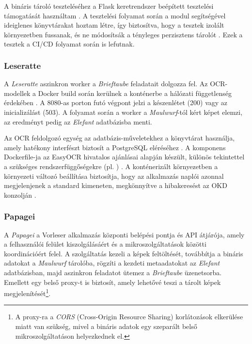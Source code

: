\documentclass[12pt]{article}
\begin{document}
	A bináris tároló teszteléséhez a Flask keretrendszer beépített tesztelési támogatását használtam \cite{flask-testing}. A tesztelési folyamat során a  modul segítségével ideiglenes könyvtárakat hoztam létre, így biztosítva, hogy a tesztek izolált környezetben fussanak, és ne módosítsák a tényleges perzisztens tárolót \cite{temp-testing}. Ezek a tesztek a CI/CD folyamat során is lefutnak.
	
	\subsubsection{Leseratte}
	A \textit{Leseratte} aszinkron worker a \textit{Brieftaube} feladatait dolgozza fel. Az OCR-modellek a Docker build során kerülnek a konténerbe a hálózati függetlenség érdekében \cite{easy-ocr-usage}. A 8080-as porton futó  végpont jelzi a készenlétet (200) vagy az inicializálást (503). A folyamat során a worker a \textit{Maulwurf}-tól kért képet elemzi, az eredményt pedig az \textit{Elefant} adatbázisba menti.
	
	Az OCR feldolgozó egység az adatbázis-műveletekhez a  könyvtárat használja, amely hatékony interfészt biztosít a PostgreSQL eléréséhez \cite{psycopg}. A komponens Dockerfile-ja az EasyOCR hivatalos ajánlásai alapján készült, különös tekintettel a szükséges rendszerfüggőségekre (pl. ) \cite{easy-ocr-docker}. A konténerizált környezetben a  környezeti változó beállítása biztosítja, hogy az alkalmazás naplói azonnal megjelenjenek a standard kimeneten, megkönnyítve a hibakeresést az OKD konzolján \cite{pythonbuffered}.
	
	\subsubsection{Papagei}
	A \textit{Papagei} a Vorleser alkalmazás központi belépési pontja és API átjárója, amely a felhasználói felület kiszolgálásáért és a mikroszolgáltatások közötti koordinációért felel. A szolgáltatás kezeli a képek feltöltését, továbbítja a bináris adatokat a \textit{Maulwurf} tárolóba, rögzíti a kezdeti metaadatokat az \textit{Elefant} adatbázisban, majd aszinkron feladatot ütemez a \textit{Brieftaube} üzenetsorba. Emellett egy belső proxy-t is biztosít, amely lehetővé teszi a tárolt képek megjelenítését\footnote{A proxy-ra a \textit{CORS} (Cross-Origin Resource Sharing) korlátozások elkerülése miatt van szükség, mivel a bináris adatok egy szeparált belső mikroszolgáltatáson helyezkednek el.}.
	
\end{document}
